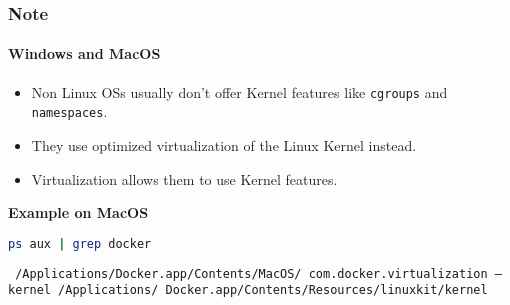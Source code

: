 \begin{frame}[fragile]
    \frametitle{Note}
    \framesubtitle{Windows and MacOS}
    \begin{itemize}
        \item Non Linux OSs usually don't offer Kernel features like \texttt{cgroups} and \texttt{namespaces}.
        \item They use optimized virtualization of the Linux Kernel instead.
        \item Virtualization allows them to use Kernel features.
    \end{itemize}
    \vspace{0.5cm}
    \textbf{Example on MacOS}\\
    \begin{lstlisting}[language=bash]
ps aux | grep docker
    \end{lstlisting}
    \texttt{
        /Applications/Docker.app/Contents/MacOS/\
        com.docker.virtualization  --kernel /Applications/
        Docker.app/Contents/Resources/linuxkit/kernel
    }
\end{frame}